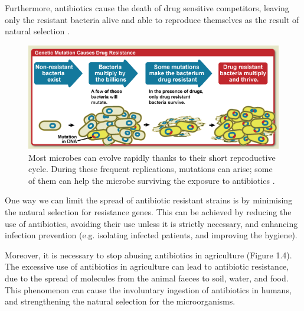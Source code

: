\documentclass[11pt]{report}
\begin{document}
\clearpage
Furthermore, antibiotics cause the death of drug sensitive competitors, leaving only the resistant bacteria alive and able to reproduce themselves as the result of natural selection \cite{doi:10.1093/emph/eou024}.

\begin{figure}[htp]
\centering
\includegraphics[scale=0.57]{immagini gamalero/Bacteria_Resistance.png}
\caption{Most microbes can evolve rapidly thanks to their short reproductive cycle. During these frequent replications, mutations can arise; some of them can help the microbe surviving the exposure to antibiotics \cite{NHI_DrugResistance}.}
\label{}
\end{figure}

One way we can limit the spread of antibiotic resistant strains is by minimising the natural selection for resistance genes.
This can be achieved by reducing the use of antibiotics, avoiding their use unless it is strictly necessary, and enhancing infection prevention (e.g. isolating infected patients, and improving the hygiene).

Moreover, it is necessary to stop abusing antibiotics in agriculture \cite{Spellberg2014} \cite{doi:10.1093/emph/eou024} (Figure 1.4).
The excessive use of antibiotics in agriculture can lead to antibiotic resistance, due to the spread of molecules from the animal faeces to soil, water, and food. This phenomenon can cause the  involuntary ingestion of antibiotics in humans, and strengthening the natural selection for the microorganisms.
\end{document}
